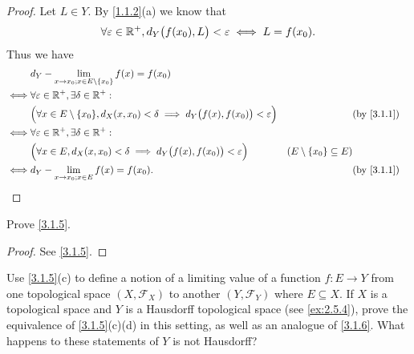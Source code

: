 \begin{proof}
  Let \(L \in Y\).
  By \cref{1.1.2}(a) we know that
  \[
    \forall \varepsilon \in \mathbb{R}^+, d_Y\big(f(x_0), L\big) < \varepsilon \iff L = f(x_0).
  \]
  Thus we have
  \begin{align*}
         & d_Y - \lim_{x \to x_0 ; x \in E \setminus \{x_0\}} f(x) = f(x_0)                                                                                                    \\
    \iff & \forall \varepsilon \in \R^+, \exists \delta \in \R^+ :                                                                                                             \\
         & \Big(\forall x \in E \setminus \{x_0\}, d_X(x, x_0) < \delta \implies d_Y\big(f(x), f(x_0)\big) < \varepsilon\Big) &                                   & \by{3.1.1} \\
    \iff & \forall \varepsilon \in \R^+, \exists \delta \in \R^+ :                                                                                                             \\
         & \Big(\forall x \in E, d_X(x, x_0) < \delta \implies d_Y\big(f(x), f(x_0)\big) < \varepsilon\Big)                   & (E \setminus \{x_0\} \subseteq E)              \\
    \iff & d_Y - \lim_{x \to x_0 ; x \in E} f(x) = f(x_0).                                                                    &                                   & \by{3.1.1}
  \end{align*}
\end{proof}

\begin{ex}\label{ex:3.1.2}
  Prove \cref{3.1.5}.
\end{ex}

\begin{proof}
  See \cref{3.1.5}.
\end{proof}

\begin{ex}\label{ex:3.1.3}
  Use \cref{3.1.5}(c) to define a notion of a limiting value of a function \(f : E \to Y\) from one topological space \((X, \mathcal{F}_X)\) to another \((Y, \mathcal{F}_Y)\) where \(E \subseteq X\).
  If \(X\) is a topological space and \(Y\) is a Hausdorff topological space (see \cref{ex:2.5.4}), prove the equivalence of \cref{3.1.5}(c)(d) in this setting, as well as an analogue of \cref{3.1.6}.
  What happens to these statements of \(Y\) is not Hausdorff?
\end{ex}

